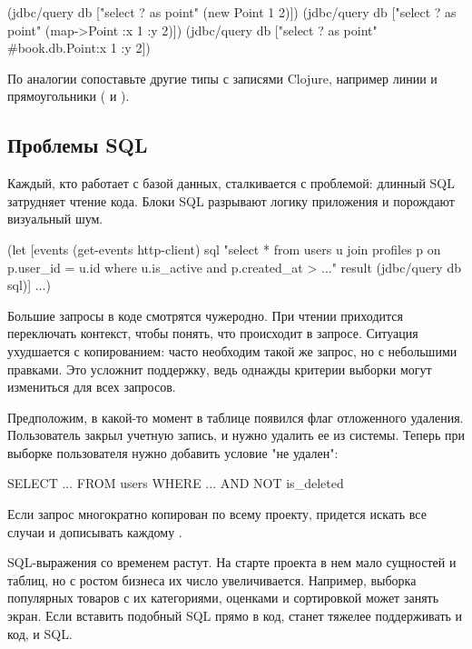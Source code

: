 \begin{english}
  \begin{clojure}
(jdbc/query db ["select ? as point" (new Point 1 2)])
(jdbc/query db ["select ? as point" (map->Point {:x 1 :y 2})])
(jdbc/query db ["select ? as point" #book.db.Point{:x 1 :y 2}])
  \end{clojure}
\end{english}

По аналогии сопоставьте другие типы с записями Clojure, например линии и прямоугольники ( и ).

\subsection{Проблемы SQL}

Каждый, кто работает с базой данных, сталкивается с проблемой: длинный SQL затрудняет чтение кода. Блоки SQL разрывают логику приложения и порождают визуальный шум.

\begin{english}
  \begin{clojure}
(let [events (get-events http-client)
      sql "select * from users u
join profiles p on p.user_id = u.id
where u.is_active
and p.created_at > ..."
      result (jdbc/query db sql)]
  ...)
  \end{clojure}
\end{english}

Большие запросы в коде смотрятся чужеродно. При чтении приходится переключать контекст, чтобы понять, что происходит в запросе. Ситуация ухудшается с копированием: часто необходим такой же запрос, но с небольшими правками. Это усложнит поддержку, ведь однажды критерии выборки могут измениться для всех запросов.

Предположим, в какой-то момент в таблице появился флаг отложенного удаления. Пользователь закрыл учетную запись, и нужно удалить ее из системы. Теперь при выборке пользователя нужно добавить условие "не удален":

\begin{english}
  \begin{clojure}
SELECT ... FROM users WHERE ... AND NOT is_deleted
  \end{clojure}
\end{english}

Если запрос многократно копирован по всему проекту, придется искать все случаи и дописывать каждому .

SQL-выражения со временем растут. На старте проекта в нем мало сущностей и таблиц, но с ростом бизнеса их число увеличивается. Например, выборка популярных товаров с их категориями, оценками и сортировкой может занять экран. Если вставить подобный SQL прямо в код, станет тяжелее поддерживать и код, и SQL.

